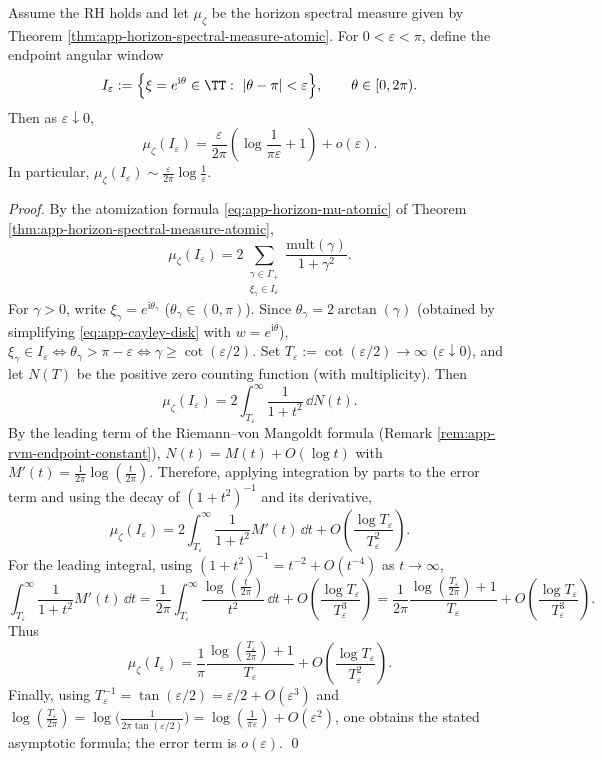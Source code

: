\begin{theorem}[First-order asymptotics of the endpoint \texorpdfstring{$\xi=-1$}{xi=-1} angular window mass]\label{thm:app-horizon-endpoint-window-mass}
Assume the RH holds and let \(\mu_{\zeta}\) be the horizon spectral measure given by Theorem \ref{thm:app-horizon-spectral-measure-atomic}.
For \(0<\varepsilon<\pi\), define the endpoint angular window
\[
I_{\varepsilon}:=\Bigl\{\xi=e^{\mathrm{i}\theta}\in\TT:\ |\theta-\pi|<\varepsilon\Bigr\},
\qquad \theta\in[0,2\pi).
\]
Then as \(\varepsilon\downarrow 0\),
\[
\mu_{\zeta}(I_{\varepsilon})
=
\frac{\varepsilon}{2\pi}\left(\log\frac{1}{\pi\varepsilon}+1\right)
+o(\varepsilon).
\]
In particular, \(\mu_{\zeta}(I_{\varepsilon})\sim \frac{\varepsilon}{2\pi}\log\frac{1}{\varepsilon}\).
\end{theorem}

\begin{proof}
By the atomization formula \eqref{eq:app-horizon-mu-atomic} of Theorem \ref{thm:app-horizon-spectral-measure-atomic},
\[
\mu_{\zeta}(I_{\varepsilon})
=
2\sum_{\substack{\gamma\in\Gamma_+\\ \xi_{\gamma}\in I_{\varepsilon}}}
\frac{\mathrm{mult}(\gamma)}{1+\gamma^2}.
\]
For \(\gamma>0\), write \(\xi_{\gamma}=e^{\mathrm{i}\theta_{\gamma}}\) (\(\theta_{\gamma}\in(0,\pi)\)).
Since \(\theta_{\gamma}=2\arctan(\gamma)\) (obtained by simplifying \eqref{eq:app-cayley-disk} with \(w=e^{\mathrm{i}\theta}\)),
\(\xi_{\gamma}\in I_{\varepsilon}\iff \theta_{\gamma}>\pi-\varepsilon\iff \gamma\ge \cot(\varepsilon/2)\).
Set \(T_{\varepsilon}:=\cot(\varepsilon/2)\to\infty\) (\(\varepsilon\downarrow 0\)), and let \(N(T)\) be the positive zero counting function (with multiplicity). Then
\[
\mu_{\zeta}(I_{\varepsilon})
=2\int_{T_{\varepsilon}}^{\infty}\frac{1}{1+t^2}\,\dd N(t).
\]
By the leading term of the Riemann--von Mangoldt formula (Remark \ref{rem:app-rvm-endpoint-constant}),
\(
N(t)=M(t)+O(\log t)
\)
with \(M'(t)=\frac{1}{2\pi}\log(\frac{t}{2\pi})\).
Therefore, applying integration by parts to the error term and using the decay of \((1+t^2)^{-1}\) and its derivative,
\[
\mu_{\zeta}(I_{\varepsilon})
=2\int_{T_{\varepsilon}}^{\infty}\frac{1}{1+t^2}M'(t)\,\dd t
+O\!\left(\frac{\log T_{\varepsilon}}{T_{\varepsilon}^2}\right).
\]
For the leading integral, using \( (1+t^2)^{-1}=t^{-2}+O(t^{-4}) \) as \(t\to\infty\),
\[
\int_{T_{\varepsilon}}^{\infty}\frac{1}{1+t^2}M'(t)\,\dd t
=\frac{1}{2\pi}\int_{T_{\varepsilon}}^{\infty}\frac{\log(\frac{t}{2\pi})}{t^2}\,\dd t
+O\!\left(\frac{\log T_{\varepsilon}}{T_{\varepsilon}^3}\right)
=\frac{1}{2\pi}\frac{\log(\frac{T_{\varepsilon}}{2\pi})+1}{T_{\varepsilon}}
+O\!\left(\frac{\log T_{\varepsilon}}{T_{\varepsilon}^3}\right).
\]
Thus
\[
\mu_{\zeta}(I_{\varepsilon})
=\frac{1}{\pi}\frac{\log(\frac{T_{\varepsilon}}{2\pi})+1}{T_{\varepsilon}}
+O\!\left(\frac{\log T_{\varepsilon}}{T_{\varepsilon}^2}\right).
\]
Finally, using \(T_{\varepsilon}^{-1}=\tan(\varepsilon/2)=\varepsilon/2+O(\varepsilon^{3})\) and
\(\log(\tfrac{T_{\varepsilon}}{2\pi})=\log\!\bigl(\tfrac{1}{2\pi\tan(\varepsilon/2)}\bigr)=\log(\tfrac{1}{\pi\varepsilon})+O(\varepsilon^{2})\), one obtains the stated asymptotic formula; the error term is \(o(\varepsilon)\). \qed
\end{proof}

